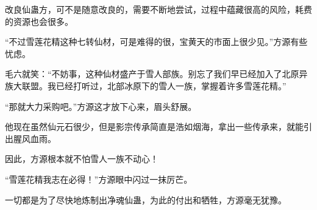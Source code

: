 \begin{this_body}
改良仙蛊方，可不是随意改良的，需要不断地尝试，过程中蕴藏很高的风险，耗费的资源也会很多。

“不过雪莲花精这种七转仙材，可是难得的很，宝黄天的市面上很少见。”方源有些忧虑。

毛六就笑：“不妨事，这种仙材盛产于雪人部族。别忘了我们早已经加入了北原异族大联盟。我已经打听过，北部冰原下的雪人一族，掌握着许多雪莲花精。”

“那就大力采购吧。”方源这才放下心来，眉头舒展。

他现在虽然仙元石很少，但是影宗传承简直是浩如烟海，拿出一些传承来，就能引出腥风血雨。

因此，方源根本就不怕雪人一族不动心！

“雪莲花精我志在必得！”方源眼中闪过一抹厉芒。

一切都是为了尽快地炼制出净魂仙蛊，为此的付出和牺牲，方源毫无犹豫。

\end{this_body}

